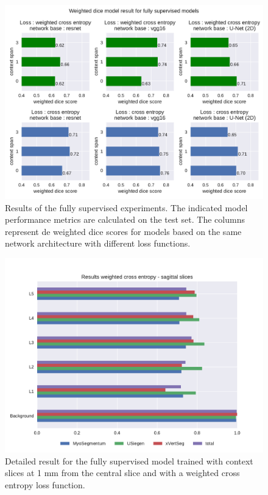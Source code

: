 \begin{figure}
    \centering
    \includegraphics[width=.95\textwidth]{images/FullySupervised.pdf}
    \caption{Results of the fully supervised experiments.
    The indicated model performance metrics are calculated on the test set.
    The columns represent de weighted dice scores for models based on the same network architecture with different loss functions.
    \label{fig:referenceExperiments}}
\end{figure}
\begin{figure}
    \centering
    \includegraphics[width=.95\textwidth]{images/full_perClass_perSource_weighted.pdf}
    \caption{Detailed result for the fully supervised model trained with context slices at 1 mm from the central slice and with a weighted cross entropy loss function.
    \label{fig:referenceWeighted}}
\end{figure}
